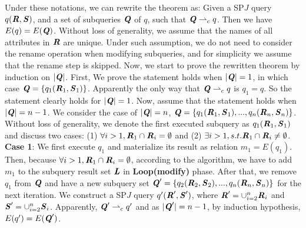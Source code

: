 \begin{Proof}
        \indent Under these notations, we can rewrite the theorem as: Given a SP$J$ query $q(\textbf{\textit{R}},\textbf{\textit{S}})$, and a set of subqueries $\textbf{\textit{Q}}$ of $q$, such that $\textbf{\textit{Q}} \rightharpoonup_c q$. Then we have $E(q)=E(\textbf{\textit{Q}})$.\newline
        \indent Without loss of generality, we assume that the names of all attributes in $\textbf{\textit{R}}$ are unique. Under such assumption, we do not need to consider the rename operation when modifying subqueries, and for simplicity we assume that the rename step is skipped.\newline
        \indent Now, we start to prove the rewritten theorem by induction on $|\textbf{\textit{Q}}|$.\newline
        \indent First, We prove the statement holds when $|\textbf{\textit{Q}}|=1$, in which case $\textbf{\textit{Q}}=\{q_1(\textbf{\textit{R}}_1,\textbf{\textit{S}}_1)\}$. Apparently the only way that $\textbf{\textit{Q}} \rightharpoonup_c q$ is $q_1=q$. So the statement clearly holds for $|\textbf{\textit{Q}}|=1$.\newline
        \indent Now, assume that the statement holds when $|\textbf{\textit{Q}}|=n-1$. We consider the case of $|\textbf{\textit{Q}}|=n$, $\textbf{\textit{Q}}=\{q_1(\textbf{\textit{R}}_1,\textbf{\textit{S}}_1),...,q_n(\textbf{\textit{R}}_n,\textbf{\textit{S}}_n)\}$.\newline
        \indent Without loss of generality, we denote the first executed subquery as $q_1(\textbf{\textit{R}}_1,\textbf{\textit{S}}_1)$ and discuss two cases: (1) $\forall i > 1, \textbf{\textit{R}}_1 \cap \textbf{\textit{R}}_i=\emptyset$ and (2) $\exists i > 1, s.t. \textbf{\textit{R}}_1 \cap \textbf{\textit{R}}_i \neq \emptyset$.\newline
        \textbf{Case 1}: We first execute $q_1$ and materialize its result as relation $m_1=E(q_1)$. Then, because $\forall i > 1, \textbf{\textit{R}}_1 \cap \textbf{\textit{R}}_i=\emptyset$, according to the algorithm, we have to add $m_1$ to the subquery result set $\textbf{\textit{L}}$ in \textbf{Loop(modify)} phase. After that, we remove $q_1$ from $\textbf{\textit{Q}}$ and have a new subquery set $\textbf{\textit{Q}}'=\{q_2(\textbf{\textit{R}}_2,\textbf{\textit{S}}_2),...,q_n(\textbf{\textit{R}}_n,\textbf{\textit{S}}_n)\}$ for the next iteration.\newline
        \indent We construct a SP$J$ query $q'(\textbf{\textit{R}}',\textbf{\textit{S}}')$, where $\textbf{\textit{R}}'= \cup_{i=2}^{n} \textbf{\textit{R}}_i$ and $\textbf{\textit{S}}'=\cup_{i=2}^{n} \textbf{\textit{S}}_i$. Apparently, $\textbf{\textit{Q}}' \rightharpoonup_c q'$ and as $|\textbf{\textit{Q}}'|=n-1$, by induction hypothesis, $E(q')=E(\textbf{\textit{Q}}')$.\newline

\end{Proof}
